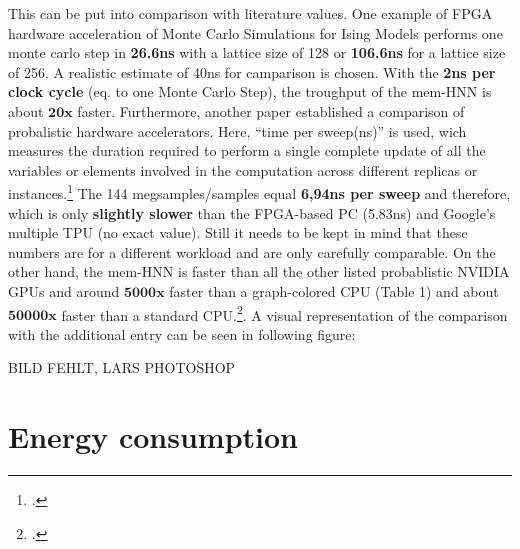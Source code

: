 This can be put into comparison with literature values. One example of \ac{FPGA} hardware acceleration of Monte Carlo Simulations for Ising Models
performs one monte carlo step in \textbf{26.6ns} with a lattice size of 128 or \textbf{106.6ns} for a lattice size of 256.
A realistic estimate of 40ns for camparison is chosen. With the \textbf{2ns per clock cycle} (eq. to one Monte Carlo Step),
the troughput of the \ac{mem-HNN} is about \(\mathbf{20x}\) faster.
Furthermore, another paper established a comparison of probalistic hardware accelerators. Here, ``time per sweep(ns)'' is used, wich measures the duration required to perform a single complete update of all the variables or elements involved in the computation across different replicas or instances.\footcite[cf.][2]{aaditAcceleratingAdaptiveParallel2023}
The 144 megsamples/samples equal \textbf{6,94ns per sweep} and therefore, which is only \textbf{slightly slower} than the FPGA-based PC (5.83ns) and Google’s
multiple TPU (no exact value). Still it needs to be kept in mind that these numbers are for a different workload and are only carefully comparable. 
On the other hand, the \ac{mem-HNN} is faster than all the other listed probablistic NVIDIA \ac{GPU}s and around \(\mathbf{5000x}\) faster than a graph-colored \ac{CPU} (Table 1) and about \(\mathbf{50000x}\) faster than a standard \ac{CPU}.\footcite[cf.][2]{aaditAcceleratingAdaptiveParallel2023}.
A visual representation of the comparison with the additional entry can be seen in following figure:

BILD FEHLT, LARS PHOTOSHOP

\section{Energy consumption}

